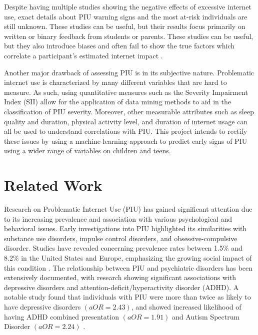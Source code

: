 \documentclass[12pt]{extarticle}
\begin{document}
  Despite having multiple studies showing the negative effects of excessive internet use, exact details about PIU warning signs and the most at-risk individuals are still unknown.
  These studies can be useful, but their results focus primarily on written or binary feedback from students or parents. 
  These studies can be useful, but they also introduce biases and often fail to show the true factors which correlate a participant's estimated internet impact \cite{Restrepo2020-pb,Aboujaoude2010-mc}.

  Another major drawback of assessing PIU is in its subjective nature. 
  Problematic internet use is characterized by many different variables that are hard to measure. 
  As such, using quantitative measures such as the Severity Impairment Index (SII) allow for the application of data mining methods to aid in the classification of PIU severity. 
  Moreover, other measurable attributes such as sleep quality and duration, physical activity level, and duration of internet usage can all be used to understand correlations with PIU.
  This project intends to rectify these issues by using a machine-learning approach to predict early signs of PIU using a wider range of variables on children and teens.

\section{Related Work}

  Research on Problematic Internet Use (PIU) has gained significant attention due to its increasing prevalence and association with various psychological and behavioral issues. 
  Early investigations into PIU highlighted its similarities with substance use disorders, impulse control disorders, and obsessive-compulsive disorder.
  Studies have revealed concerning prevalence rates between 1.5\% and 8.2\% in the United States and Europe, emphasizing the growing social impact of this condition \cite{Cash2012-rb}. 
  The relationship between PIU and psychiatric disorders has been extensively documented, with research showing significant associations with depressive disorders and attention-deficit/hyperactivity disorder (ADHD). 
  A notable study found that individuals with PIU were more than twice as likely to have depressive disorders $(aOR = 2.43)$, and showed increased likelihood of having ADHD combined presentation $(aOR = 1.91)$ and Autism Spectrum Disorder $(aOR = 2.24)$ \cite{Restrepo2020-pb}.
\end{document}
